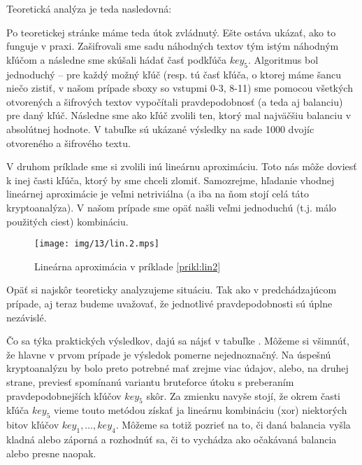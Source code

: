 \begin{priklad}
    Teoretická analýza je teda nasledovná:
    

    Po teoretickej stránke máme teda útok zvládnutý. Ešte ostáva
    ukázať, ako to funguje v praxi. Zašifrovali sme sadu náhodných
    textov tým istým náhodným kľúčom a následne sme skúšali hádať časť
    podkľúča $key_5$. Algoritmus bol jednoduchý -- pre každý možný
    kľúč (resp. tú časť kľúča, o ktorej máme šancu niečo zistiť, v
    našom prípade sboxy so vstupmi 0-3, 8-11) sme pomocou všetkých
    otvorených a šifrových textov vypočítali pravdepodobnosť (a teda
    aj balanciu) pre daný kľúč. Následne sme ako kľúč zvolili ten,
    ktorý mal najväčšiu balanciu v absolútnej hodnote. V tabuľke
     sú ukázané výsledky na sade 1000 dvojíc otvoreného a
    šifrového textu.
    
\end{priklad}

\begin{priklad}
    \label{prikl:lin2}
    V druhom príklade sme si zvolili inú lineárnu aproximáciu. Toto
    nás môže doviesť k inej časti kľúča, ktorý by sme chceli zlomiť.
    Samozrejme, hľadanie vhodnej lineárnej aproximácie je veľmi
    netriviálna (a iba na ňom stojí celá táto kryptoanalýza). V našom
    prípade sme opäť našli veľmi jednoduchú (t.j. málo použitých
    ciest) kombináciu.
    \begin{figure}[H]
        \centering
        \texttt{[image: img/13/lin.2.mps]}
        \caption{Lineárna aproximácia v príklade \ref{prikl:lin2}}
    \end{figure}
    Opäť si najskôr teoreticky analyzujeme situáciu. Tak ako v
    predchádzajúcom prípade, aj teraz budeme uvažovať, že jednotlivé
    pravdepodobnosti sú úplne nezávislé.
    

    Čo sa týka praktických výsledkov, dajú sa nájsť v tabuľke
    . Môžeme si všimnúť, že hlavne v prvom prípade je
    výsledok pomerne nejednoznačný. Na úspešnú kryptoanalýzu by bolo
    preto potrebné mať zrejme viac údajov, alebo, na druhej strane,
    previesť spomínanú variantu bruteforce útoku s preberaním
    pravdepodobnejších kľúčov $key_5$ skôr. Za zmienku navyše stojí,
    že okrem časti kľúča $key_5$ vieme touto metódou získať ja
    lineárnu kombináciu (xor) niektorých bitov kľúčov $key_1, \dots,
    key_4$. Môžeme sa totiž pozrieť na to, či daná balancia vyšla
    kladná alebo záporná a rozhodnúť sa, či to vychádza ako očakávaná
    balancia alebo presne naopak.

    
\end{priklad}



